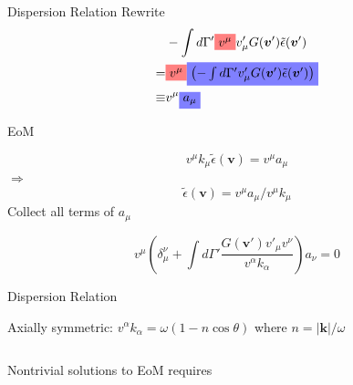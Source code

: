 \documentclass[9pt]{beamer}
\begin{document}
\begin{darkframes}
\begin{frame}{Dispersion Relation}
Rewrite
\begin{align*}
    &- \int d\Gamma' \colorbox{red!50}{$v^\mu$} v'_\mu G(\boldsymbol{v}') \tilde \epsilon (\boldsymbol{v}') \\
    =& \colorbox{red!50}{$v^\mu$} \colorbox{blue!50}{$\left(- \int d\Gamma'  v'_\mu G(\boldsymbol{v}') \tilde \epsilon (\boldsymbol{v}') \right)$} \\
    \equiv&  v^\mu \colorbox{blue!50}{$a_\mu$}
\end{align*}

\pause

EoM


\begin{equation*}
    v^\mu k_\mu \tilde \epsilon (\boldsymbol{v}) = v^\mu a_\mu
\end{equation*}
\pause
{\centering
$\Longrightarrow$
\begin{equation*}
    \tilde \epsilon (\boldsymbol{v}) = v^\mu a_\mu/v^\mu k_\mu
\end{equation*}
}
Collect all terms of $a_\mu$

\begin{equation*}
    v^\mu \left( \delta_\mu^\nu +  \int d\Gamma' \frac{ G(\boldsymbol{ v}') v'_\mu v^\nu }{ v^\alpha k_\alpha }   \right) a_\nu = 0
\end{equation*}

\end{frame}


\begin{frame}{Dispersion Relation}


\begin{tcolorbox}[standard jigsaw, opacityback=0, coltext=white]
Axially symmetric: $v^\alpha k_\alpha = \omega (1 - n \cos \theta)$ where $n = \lvert \boldsymbol{k} \rvert / \omega $
\end{tcolorbox}

\begin{columns}[T]
    \begin{column}{0.5\textwidth}
Nontrivial solutions to EoM requires


\end{column}
\end{columns}
\end{frame}
\end{darkframes}
\end{document}
